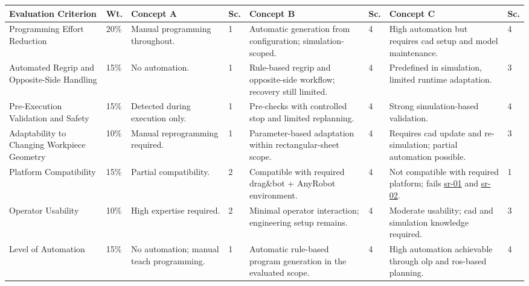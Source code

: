 ﻿\begin{landscape}
\begin{table}[H]
\centering
\small
\setlength{\tabcolsep}{4pt}
\renewcommand{\arraystretch}{1.18}

\begin{tabularx}{\linewidth}{
L{3.2cm}
C{1.1cm}
Y
C{0.7cm}
Y
C{0.7cm}
Y
C{0.7cm}
}
\hline
\textbf{Evaluation Criterion} &
\textbf{Wt.} &
\textbf{Concept A} &
\textbf{Sc.} &
\textbf{Concept B} &
\textbf{Sc.} &
\textbf{Concept C} &
\textbf{Sc.} \\
\hline

Programming Effort Reduction &
20\% &
Manual programming throughout. &
1 &
Automatic generation from configuration; simulation-scoped. &
4 &
High automation but requires \acs{cad} setup and model maintenance. &
4 \\
\hline

Automated Regrip and Opposite-Side Handling &
15\% &
No automation. &
1 &
Rule-based regrip and opposite-side workflow; recovery still limited. &
4 &
Predefined in simulation, limited runtime adaptation. &
3 \\
\hline

Pre-Execution Validation and Safety &
15\% &
Detected during execution only. &
1 &
Pre-checks with controlled stop and limited replanning. &
4 &
Strong simulation-based validation. &
4 \\
\hline

Adaptability to Changing Workpiece Geometry &
10\% &
Manual reprogramming required. &
1 &
Parameter-based adaptation within rectangular-sheet scope. &
4 &
Requires \acs{cad} update and re-simulation; partial automation possible. &
3 \\
\hline

Platform Compatibility &
15\% &
Partial compatibility. &
2 &
Compatible with required drag\&bot + AnyRobot environment. &
4 &
Not compatible with required platform; fails \hyperref[subsubsec:sr-01-virtual-execution-environment]{\acs{sr}-01} and \hyperref[subsubsec:sr-02-communication-interface-requirement]{\acs{sr}-02}. &
1 \\
\hline

Operator Usability &
10\% &
High expertise required. &
2 &
Minimal operator interaction; engineering setup remains. &
4 &
Moderate usability; \acs{cad} and simulation knowledge required. &
3 \\
\hline

Level of Automation &
15\% &
No automation; manual teach programming. &
1 &
Automatic rule-based program generation in the evaluated scope. &
4 &
High automation achievable through \acs{olp} and \acs{ros}-based planning. &
4 \\
\hline


\end{tabularx}
\end{table}
\end{landscape}
